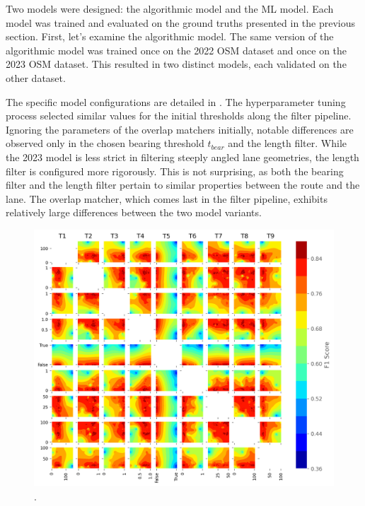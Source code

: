Two models were designed: the algorithmic model and the ML model. Each model was trained and evaluated on the ground truths presented in the previous section. First, let's examine the algorithmic model. The same version of the algorithmic model was trained once on the 2022 OSM dataset and once on the 2023 OSM dataset. This resulted in two distinct models, each validated on the other dataset.

The specific model configurations are detailed in . The hyperparameter tuning process selected similar values for the initial thresholds along the filter pipeline. Ignoring the parameters of the overlap matchers initially, notable differences are observed only in the chosen bearing threshold $t_{bear}$ and the length filter. While the 2023 model is less strict in filtering steeply angled lane geometries, the length filter is configured more rigorously. This is not surprising, as both the bearing filter and the length filter pertain to similar properties between the route and the lane. The overlap matcher, which comes last in the filter pipeline, exhibits relatively large differences between the two model variants. 

\begin{figure}[t]
\centering 
\includegraphics[width=\linewidth]{images/matching-hpt-contour-topological-osm-updated.png}
\caption{.}
\label{fig:hyperparameter-contourplot}
\end{figure}

